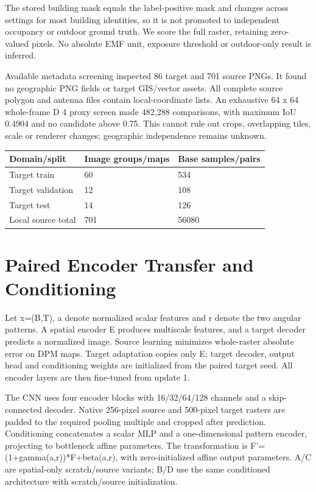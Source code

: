\documentclass[conference]{IEEEtran}
\begin{document}
The stored building mask equals the label-positive mask and changes across settings for most building identities, so it is not promoted to independent occupancy or outdoor ground truth. We score the full raster, retaining zero-valued pixels. No absolute EMF unit, exposure threshold or outdoor-only result is inferred.

Available metadata screening inspected 86 target and 701 source PNGs. It found no geographic PNG fields or target GIS/vector assets. All complete source polygon and antenna files contain local-coordinate lists. An exhaustive 64 x 64 whole-frame D 4 proxy screen made 482,288 comparisons, with maximum IoU 0.4904 and no candidate above 0.75. This cannot rule out crops, overlapping tiles, scale or renderer changes; geographic independence remains unknown.

\begin{table}[t]\centering\small
\begin{tabular}{lll}
\toprule
Domain/split & Image groups/maps & Base samples/pairs \\
\midrule
Target train & 60 & 534 \\
Target validation & 12 & 108 \\
Target test & 14 & 126 \\
Local source total & 701 & 56080 \\
\bottomrule\end{tabular}\end{table}
\section{Paired Encoder Transfer and Conditioning}
Let x=(B,T), a denote normalized scalar features and r denote the two angular patterns. A spatial encoder E produces multiscale features, and a target decoder predicts a normalized image. Source learning minimizes whole-raster absolute error on DPM maps. Target adaptation copies only E; target decoder, output head and conditioning weights are initialized from the paired target seed. All encoder layers are then fine-tuned from update 1.

The CNN uses four encoder blocks with 16/32/64/128 channels and a skip-connected decoder. Native 256-pixel source and 500-pixel target rasters are padded to the required pooling multiple and cropped after prediction. Conditioning concatenates a scalar MLP and a one-dimensional pattern encoder, projecting to bottleneck affine parameters. The transformation is F'=(1+gamma(a,r))*F+beta(a,r), with zero-initialized affine output parameters. A/C are spatial-only scratch/source variants; B/D use the same conditioned architecture with scratch/source initialization.
\end{document}
